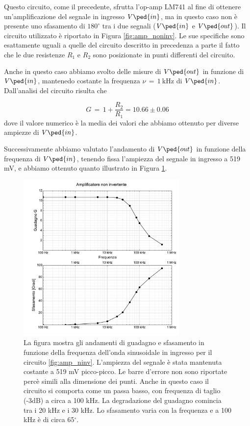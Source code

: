 Questo circuito, come il precedente, sfrutta l'op-amp LM741 al fine di ottenere un'amplificazione del segnale in ingresso $V\ped{in}$, ma in questo caso non è presente uno sfasamento di $180^\circ$ tra i due segnali ($V\ped{in}$ e $V\ped{out}$).
Il circuito utilizzato è riportato in Figura \ref{fig:amp_noninv}. Le sue specifiche sono esattamente uguali a quelle del circuito descritto in precedenza a parte il fatto che le due resistenze $R_1$ e $R_2$ sono posizionate in punti differenti del circuito.

Anche in questo caso abbiamo svolto delle misure di $V\ped{out}$ in funzione di $V\ped{in}$, mantenedo costante la frequenza $\nu\,=\,\SI{1}{\kilo\hertz}$ di $V\ped{in}$. Dall'analisi del circuito risulta che 

\begin{equation}
    G \,=\, 1 + \frac{R_2}{R_1} = 10.66 \pm 0.06
\end{equation}
%
dove il valore numerico è la media dei valori che abbiamo ottenuto per diverse ampiezze di $V\ped{in}$.

Successivamente abbiamo valutato l'andamento di $V\ped{out}$ in funzione della frequenza di $V\ped{in}$, tenendo fissa
l'ampiezza del segnale in ingresso a 519 mV, e abbiamo ottenuto quanto illustrato in Figura \ref{fig:g2}.

\begin{figure}
    \includegraphics[width=0.75\textwidth]{amp_ninv.pdf}
    \caption{La figura mostra gli andamenti di guadagno e sfasamento in funzione della
        frequenza dell'onda sinusoidale in ingresso per il circuito \ref{fig:amp_ninv}. L'ampiezza del segnale è
        stata mantenuta costante a 519 mV picco-picco. Le barre d'errore non sono riportate percè simili alla dimensione
        dei punti. Anche in questo caso il circuito si comporta come un passa basso, con frequenza di taglio
        (-3dB) a circa a 100 kHz. La degradazione del guadagno comincia tra i 20 kHz e i 30 kHz.
        Lo sfasamento varia con la frequenza e a 100 kHz è di circa 65$^\circ$.}
    \label{fig:g2}
\end{figure}

